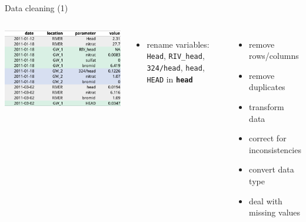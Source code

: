 \documentclass[8pt,ignorenonframetext,]{beamer}
\newenvironment{Shaded}{\begin{snugshade}}{\end{snugshade}}
\newcommand{\KeywordTok}[1]{\textcolor[rgb]{0.13,0.29,0.53}{\textbf{{#1}}}}
\newcommand{\StringTok}[1]{\textcolor[rgb]{0.31,0.60,0.02}{{#1}}}
\newcommand{\NormalTok}[1]{{#1}}
\providecommand{\tightlist}{%
  \setlength{\itemsep}{0pt}\setlength{\parskip}{0pt}}
\newcommand{\columnsbegin}{\begin{columns}}
\newcommand{\columnsend}{\end{columns}}
\begin{document}
\begin{frame}[fragile]{Data cleaning (1)}

\columnsbegin


\includegraphics{imgPres/data_tidying_table_messy_bad.png}

\begin{itemize}
\item
  rename variables: \texttt{Head}, \texttt{RIV\_head},
  \texttt{324/head}, \texttt{head}, \texttt{HEAD} in
  \textbf{\texttt{head}}

\begin{Shaded}
\end{Shaded}
\end{itemize}


\begin{itemize}
\tightlist
\item
  remove rows/columns
\item
  remove duplicates
\item
  transform data
\item
  correct for inconsistencies
\item
  convert data type
\item
  deal with missing values
\end{itemize}

\columnsend

\end{frame}
\end{document}

